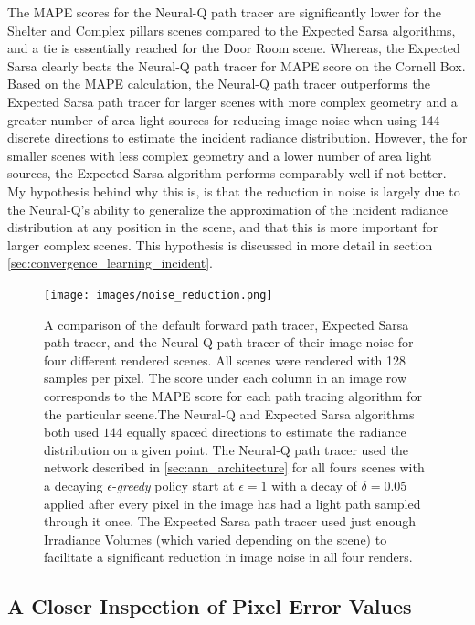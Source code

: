 \documentclass[../dissertation.tex]{subfiles}
\begin{document}
The MAPE scores for the Neural-Q path tracer are significantly lower for the Shelter and Complex pillars scenes compared to the Expected Sarsa algorithms, and a tie is essentially reached for the Door Room scene. Whereas, the Expected Sarsa clearly beats the Neural-Q path tracer for MAPE score on the Cornell Box. Based on the MAPE calculation, the Neural-Q path tracer outperforms the Expected Sarsa path tracer for larger scenes with more complex geometry and a greater number of area light sources for reducing image noise when using 144 discrete directions to estimate the incident radiance distribution. However, the for smaller scenes with less complex geometry and a lower number of area light sources, the Expected Sarsa algorithm performs comparably well if not better. My hypothesis behind why this is, is that the reduction in noise is largely due to the Neural-Q's ability to generalize the approximation of the incident radiance distribution at any position in the scene, and that this is more important for larger complex scenes. This hypothesis is discussed in more detail in section \ref{sec:convergence_learning_incident}.

\begin{figure}[hbtp]
\begin{center}
\texttt{[image: images/noise\_reduction.png]}    
\end{center}
\caption{A comparison of the default forward path tracer, Expected Sarsa path tracer, and the Neural-Q path tracer of their image noise for four different rendered scenes. All scenes were rendered with 128 samples per pixel. The score under each column in an image row corresponds to the MAPE score for each  path tracing algorithm for the particular scene.The Neural-Q and Expected Sarsa algorithms both used $144$ equally spaced directions to estimate the radiance distribution on a given point. The Neural-Q path tracer used the network described in \ref{sec:ann_architecture} for all fours scenes with a decaying $\epsilon$-\textit{greedy} policy start at $\epsilon =1$ with a decay of $\delta = 0.05$ applied after every pixel in the image has had a light path sampled through it once. The Expected Sarsa path tracer used just enough Irradiance Volumes (which varied depending on the scene) to facilitate a significant reduction in image noise in all four renders.}
\label{fig:mape_results_grid}
\end{figure}

\subsection{A Closer Inspection of Pixel Error Values}
\end{document}
